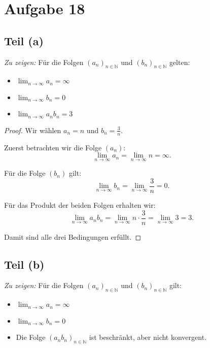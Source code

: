 \documentclass{article}
\theoremstyle{definition}
\theoremstyle{remark}
\begin{document}
\section*{Aufgabe 18}

\subsection*{Teil (a)}
\textit{Zu zeigen:} Für die Folgen \( (a_n)_{n \in \mathbb{N}} \) und \( (b_n)_{n \in \mathbb{N}} \) gelten:
\begin{itemize}
	\item \( \lim_{n \to \infty} a_n = \infty \)
	\item \( \lim_{n \to \infty} b_n = 0 \)
	\item \( \lim_{n \to \infty} a_n b_n = 3 \)
\end{itemize}

\begin{proof}
	Wir wählen \( a_n = n \) und \( b_n = \frac{3}{n} \).

	Zuerst betrachten wir die Folge \( (a_n) \):
	\[ \lim_{n \to \infty} a_n = \lim_{n \to \infty} n = \infty. \]

	Für die Folge \( (b_n) \) gilt:
	\[ \lim_{n \to \infty} b_n = \lim_{n \to \infty} \frac{3}{n} = 0. \]

	Für das Produkt der beiden Folgen erhalten wir:
	\[ \lim_{n \to \infty} a_n b_n = \lim_{n \to \infty} n \cdot \frac{3}{n} = \lim_{n \to \infty} 3 = 3. \]

	Damit sind alle drei Bedingungen erfüllt.
\end{proof}

\subsection*{Teil (b)}
\textit{Zu zeigen:} Für die Folgen \( (a_n)_{n \in \mathbb{N}} \) und \( (b_n)_{n \in \mathbb{N}} \) gilt:
\begin{itemize}
	\item \( \lim_{n \to \infty} a_n = \infty \)
	\item \( \lim_{n \to \infty} b_n = 0 \)
	\item Die Folge \( (a_n b_n)_{n \in \mathbb{N}} \) ist beschränkt, aber nicht konvergent.
\end{itemize}
\end{document}
